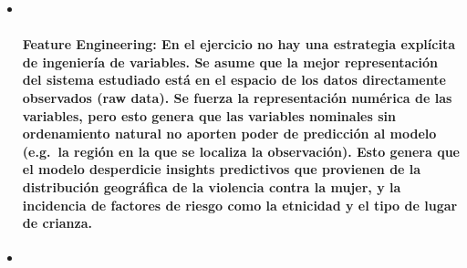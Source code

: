 \documentclass[]{article}
\let\oldparagraph\paragraph
\renewcommand{\paragraph}[1]{\oldparagraph{#1}\mbox{}}
\begin{document}
\begin{itemize}
\item ~
  \paragraph{\texorpdfstring{\textbf{Feature Engineering}: En el
  ejercicio no hay una estrategia explícita de ingeniería de variables.
  Se asume que la mejor representación del sistema estudiado está en el
  espacio de los datos directamente observados (raw data). Se fuerza la
  representación numérica de las variables, pero esto genera que las
  variables nominales sin ordenamiento natural no aporten poder de
  predicción al modelo (e.g.~la región en la que se localiza la
  observación). Esto genera que el modelo desperdicie \textbf{insights
  predictivos} que provienen de la distribución geográfica de la
  violencia contra la mujer, y la incidencia de factores de riesgo como
  la etnicidad y el tipo de lugar de
  crianza.}{Feature Engineering: En el ejercicio no hay una estrategia explícita de ingeniería de variables. Se asume que la mejor representación del sistema estudiado está en el espacio de los datos directamente observados (raw data). Se fuerza la representación numérica de las variables, pero esto genera que las variables nominales sin ordenamiento natural no aporten poder de predicción al modelo (e.g.~la región en la que se localiza la observación). Esto genera que el modelo desperdicie insights predictivos que provienen de la distribución geográfica de la violencia contra la mujer, y la incidencia de factores de riesgo como la etnicidad y el tipo de lugar de crianza.}}\label{feature-engineering-en-el-ejercicio-no-hay-una-estrategia-explicita-de-ingenieria-de-variables.-se-asume-que-la-mejor-representacion-del-sistema-estudiado-esta-en-el-espacio-de-los-datos-directamente-observados-raw-data.-se-fuerza-la-representacion-numerica-de-las-variables-pero-esto-genera-que-las-variables-nominales-sin-ordenamiento-natural-no-aporten-poder-de-prediccion-al-modelo-e.g.la-region-en-la-que-se-localiza-la-observacion.-esto-genera-que-el-modelo-desperdicie-insights-predictivos-que-provienen-de-la-distribucion-geografica-de-la-violencia-contra-la-mujer-y-la-incidencia-de-factores-de-riesgo-como-la-etnicidad-y-el-tipo-de-lugar-de-crianza.}
\item ~

\end{itemize}
\end{document}
